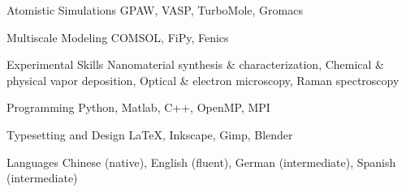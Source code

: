 

\begin{cvskills}
  \cvskill
  {Atomistic Simulations}
  {GPAW, VASP, TurboMole, Gromacs}

  \cvskill
  {Multiscale Modeling}
  {COMSOL, FiPy, Fenics}

  \cvskill
  {Experimental Skills}
  {
    Nanomaterial synthesis \& characterization, 
    Chemical \& physical vapor deposition, \newline
    Optical \& electron microscopy,
    Raman spectroscopy
  }

  \cvskill
  {Programming}
  {Python, Matlab, C++, OpenMP, MPI}

  \cvskill
  {Typesetting and Design}
  {\LaTeX, Inkscape, Gimp, Blender}

  \cvskill
  {Languages}
  {Chinese (native), English (fluent),
    German (intermediate), Spanish (intermediate)}
\end{cvskills}